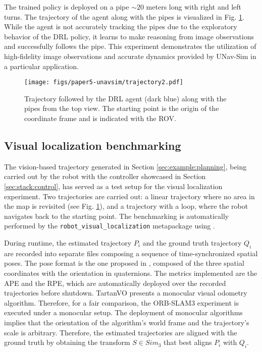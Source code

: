 The trained policy is deployed on a pipe $\sim20$ meters long with right and left turns. The trajectory of the agent along with the pipes is visualized in Fig. \ref{fig:trajectory_drl}.
While the agent is not accurately tracking the pipes due to the exploratory behavior of the \ac{DRL} policy, it learns to make reasoning from image observations and successfully follows the pipe.
This experiment demonstrates the utilization of high-fidelity image observations and accurate dynamics provided by UNav-Sim in a particular application.

\begin{figure}[t]
    \centering
    \texttt{[image: figs/paper5-unavsim/trajectory2.pdf]}
    \caption[Trajectory drawn by the ROV in the DRL experiments]{Trajectory followed by the \ac{DRL} agent (dark blue) along with the pipes from the top view. The starting point is the origin of the coordinate frame and is indicated with the \ac{ROV}.
    }
    \label{fig:trajectory_drl}
\end{figure}



\subsection{Visual localization benchmarking}
The vision-based trajectory generated in Section \ref{sec:example:planning}, being carried out by the robot with the controller showcased in Section \ref{sec:stack:control}, has served as a test setup for the visual localization experiment.
Two trajectories are carried out: a linear trajectory where no area in the map is revisited (see Fig. \ref{fig:trajectory_drl}), and a trajectory with a loop, where the robot navigates back to the starting point.
The benchmarking is automatically performed by the \texttt{robot\_visual\_localization} metapackage using \cite{grupp2017evo}. 

During runtime, the estimated trajectory $P_i$ and the ground truth trajectory $Q_i$ are recorded into separate files composing a sequence of time-synchronized spatial poses. The pose format is the one proposed in \cite{sturm2012tumrgbd}, composed of the three spatial coordinates with the orientation in quaternions.
The metrics implemented are the \ac{APE} and the \ac{RPE}, which are automatically deployed over the recorded trajectories before shutdown. TartanVO presents a monocular visual odometry algorithm. Therefore, for a fair comparison, the ORB-SLAM3 experiment is executed under a monocular setup. 
The deployment of monocular algorithms implies that the orientation of the algorithm's world frame and the trajectory's scale is arbitrary. Therefore, the estimated trajectories are aligned with the ground truth by obtaining the transform $S \in Sim_3$ that best aligns $P_i$ with $Q_i$.

